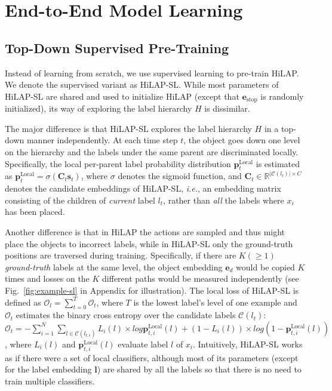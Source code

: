 \documentclass[11pt,a4paper]{article}
\newcommand{\ie}{\textit{i.e.}} \newcommand{\eg}{\textit{e.g.}}
\begin{document}
\section{End-to-End Model Learning}
\subsection{Top-Down Supervised Pre-Training}
\label{subsec_tdsp}

Instead of learning from scratch, we use supervised learning to pre-train HiLAP.
We denote the supervised variant as HiLAP-SL.
While most parameters of HiLAP-SL are shared and used to initialize HiLAP (except that $\textbf{e}_{\text{stop}}$ is randomly initialized), its way of exploring the label hierarchy $H$ is dissimilar.

The major difference is that HiLAP-SL explores the label hierarchy $H$ in a top-down manner independently.
At each time step $t$, the object goes down one level on the hierarchy and the labels under the same parent are discriminated locally.
Specifically, the local per-parent label probability distribution $\textbf{p}_t^{\text{Local}}$ is estimated as $\textbf{p}_t^{\text{Local}} = \sigma (\textbf{C}_t \textbf{s}_t)$,
where $\sigma$ denotes the sigmoid function, and $\textbf{C}_t \in \mathbb{R}^{|\mathcal{C}(l_t)| \times C}$ denotes the candidate embeddings of HiLAP-SL, \ie, an embedding matrix consisting of the children of \textit{current} label $l_t$, rather than \textit{all} the labels where $x_i$ has been placed. 

Another difference is that in HiLAP the actions are sampled and thus might place the objects to incorrect labels, while in HiLAP-SL only the ground-truth positions are traversed during training.
Specifically, if there are $K (\geq 1)$ \textit{ground-truth} labels at the same level, the object embedding $\textbf{e}_d$ would be copied $K$ times and losses on the $K$ different paths would be measured independently (see Fig.~\ref{fig:example-sl} in Appendix for illustration).
The local loss of HiLAP-SL is defined as $\mathcal{O}_{l} =  \sum_{t=0}^T \mathcal{O}_t$,
where $T$ is the lowest label's level of one example and $\mathcal{O}_t$ estimates the binary cross entropy over the candidate labels $\mathcal{C}(l_t)$:
$\mathcal{O}_{t} =  -\sum_{i=1}^N \sum_{l \in \mathcal{C}(l_{t, i})}  L_i(l) \times  log \textbf{p}_{t, i}^{\text{Local}}(l) + (1 - L_i(l))  \times log(1 - \textbf{p}_{t, i}^{\text{Local}}(l))$,
where $L_i(l)$ and $\textbf{p}_{t, i}^{\text{Local}}(l)$ evaluate label $l$ of $x_i$.
Intuitively, HiLAP-SL works as if there were a set of local classifiers, although most of its parameters (except for the label embedding $\textbf{l}$) are shared by all the labels so that there is no need to train multiple classifiers.
\end{document}

